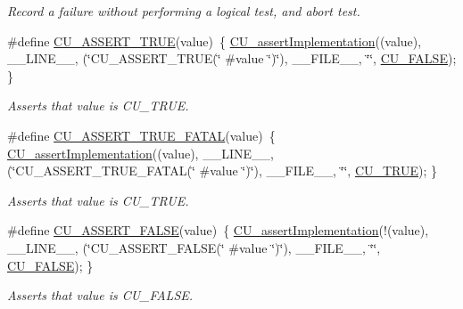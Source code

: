 \begin{DoxyCompactItemize}
\begin{DoxyCompactList}\small\item\em Record a failure without performing a logical test, and abort test. \end{DoxyCompactList}\item 
\#define \hyperlink{group__Framework_ga747d6e9d7ae9eb15091f923a69c19bfc}{C\-U\-\_\-\-A\-S\-S\-E\-R\-T\-\_\-\-T\-R\-U\-E}(value)~\{ \hyperlink{group__Framework_ga31a858e8b496b2af992b63902064c5fa}{C\-U\-\_\-assert\-Implementation}((value), \-\_\-\-\_\-\-L\-I\-N\-E\-\_\-\-\_\-, (\char`\"{}C\-U\-\_\-\-A\-S\-S\-E\-R\-T\-\_\-\-T\-R\-U\-E(\char`\"{} \#value \char`\"{})\char`\"{}), \-\_\-\-\_\-\-F\-I\-L\-E\-\_\-\-\_\-, \char`\"{}\char`\"{}, \hyperlink{group__Framework_ga7453214541b156ef868681eaafe60860}{C\-U\-\_\-\-F\-A\-L\-S\-E}); \}
\begin{DoxyCompactList}\small\item\em Asserts that value is C\-U\-\_\-\-T\-R\-U\-E. \end{DoxyCompactList}\item 
\#define \hyperlink{group__Framework_ga86beba3f4f6c14fbd8a6ac4fd106740d}{C\-U\-\_\-\-A\-S\-S\-E\-R\-T\-\_\-\-T\-R\-U\-E\-\_\-\-F\-A\-T\-A\-L}(value)~\{ \hyperlink{group__Framework_ga31a858e8b496b2af992b63902064c5fa}{C\-U\-\_\-assert\-Implementation}((value), \-\_\-\-\_\-\-L\-I\-N\-E\-\_\-\-\_\-, (\char`\"{}C\-U\-\_\-\-A\-S\-S\-E\-R\-T\-\_\-\-T\-R\-U\-E\-\_\-\-F\-A\-T\-A\-L(\char`\"{} \#value \char`\"{})\char`\"{}), \-\_\-\-\_\-\-F\-I\-L\-E\-\_\-\-\_\-, \char`\"{}\char`\"{}, \hyperlink{group__Framework_ga99641394bc766ca9c4a295e942fed1ef}{C\-U\-\_\-\-T\-R\-U\-E}); \}
\begin{DoxyCompactList}\small\item\em Asserts that value is C\-U\-\_\-\-T\-R\-U\-E. \end{DoxyCompactList}\item 
\#define \hyperlink{group__Framework_ga0f74cb3f0a6d4393e4ffeb541b14ee38}{C\-U\-\_\-\-A\-S\-S\-E\-R\-T\-\_\-\-F\-A\-L\-S\-E}(value)~\{ \hyperlink{group__Framework_ga31a858e8b496b2af992b63902064c5fa}{C\-U\-\_\-assert\-Implementation}(!(value), \-\_\-\-\_\-\-L\-I\-N\-E\-\_\-\-\_\-, (\char`\"{}C\-U\-\_\-\-A\-S\-S\-E\-R\-T\-\_\-\-F\-A\-L\-S\-E(\char`\"{} \#value \char`\"{})\char`\"{}), \-\_\-\-\_\-\-F\-I\-L\-E\-\_\-\-\_\-, \char`\"{}\char`\"{}, \hyperlink{group__Framework_ga7453214541b156ef868681eaafe60860}{C\-U\-\_\-\-F\-A\-L\-S\-E}); \}
\begin{DoxyCompactList}\small\item\em Asserts that value is C\-U\-\_\-\-F\-A\-L\-S\-E. \end{DoxyCompactList}\item 

\end{DoxyCompactItemize}
